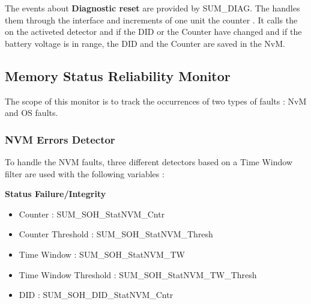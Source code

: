 {
The events about \textbf{Diagnostic reset} are provided by SUM\_DIAG.\newline\newline 
The \textbf{} handles them through the interface  and increments  of one unit the counter
.\newline\newline
It calls the  on the activeted detector and if the DID or the Counter have changed and if the battery voltage is in range, the DID and the Counter are saved in the NvM.

}
{
     
}

\newpage

\subsection{Memory Status Reliability Monitor}
{
The scope of this monitor is to track the occurrences of two types of faults : NvM and OS faults.
}
{
}

\newline

    \subsubsection{NVM Errors Detector}
    
    
    To handle the NVM faults, three different detectors based on a Time Window filter are used  with the following variables :\newline\newline
    
    \textbf{Status Failure/Integrity}
    \begin{itemize}
        \item Counter               : SUM_SOH_StatNVM_Cntr
        \item Counter Threshold     : SUM_SOH_StatNVM_Thresh
        \item Time Window           : SUM_SOH_StatNVM_TW
        \item Time Window Threshold : SUM_SOH_StatNVM_TW_Thresh
        \item DID                   : SUM_SOH_DID_StatNVM_Cntr
    \end{itemize}
    

